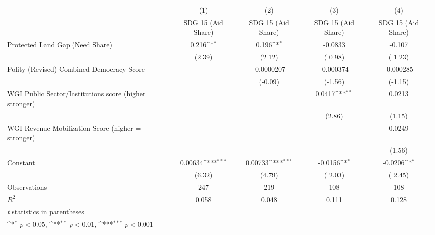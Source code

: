 {
\def\sym#1{\ifmmode^{#1}\else\(^{#1}\)\fi}
\begin{tabular}{l*{4}{c}}
\hline\hline
                &\multicolumn{1}{c}{(1)}&\multicolumn{1}{c}{(2)}&\multicolumn{1}{c}{(3)}&\multicolumn{1}{c}{(4)}\\
                &\multicolumn{1}{c}{SDG 15 (Aid Share)}&\multicolumn{1}{c}{SDG 15 (Aid Share)}&\multicolumn{1}{c}{SDG 15 (Aid Share)}&\multicolumn{1}{c}{SDG 15 (Aid Share)}\\
\hline
Protected Land Gap (Need Share)&    0.216\sym{*}  &    0.196\sym{*}  &  -0.0833         &   -0.107         \\
                &   (2.39)         &   (2.12)         &  (-0.98)         &  (-1.23)         \\
[1em]
Polity (Revised) Combined Democracy Score&                  &-0.0000207         &-0.000374         &-0.000285         \\
                &                  &  (-0.09)         &  (-1.56)         &  (-1.15)         \\
[1em]
WGI Public Sector/Institutions score (higher = stronger)&                  &                  &   0.0417\sym{**} &   0.0213         \\
                &                  &                  &   (2.86)         &   (1.15)         \\
[1em]
WGI Revenue Mobilization Score (higher = stronger)&                  &                  &                  &   0.0249         \\
                &                  &                  &                  &   (1.56)         \\
[1em]
Constant        &  0.00634\sym{***}&  0.00733\sym{***}&  -0.0156\sym{*}  &  -0.0206\sym{*}  \\
                &   (6.32)         &   (4.79)         &  (-2.03)         &  (-2.45)         \\
\hline
Observations    &      247         &      219         &      108         &      108         \\
\(R^{2}\)       &    0.058         &    0.048         &    0.111         &    0.128         \\
\hline\hline
\multicolumn{5}{l}{\footnotesize \textit{t} statistics in parentheses}\\
\multicolumn{5}{l}{\footnotesize \sym{*} \(p<0.05\), \sym{**} \(p<0.01\), \sym{***} \(p<0.001\)}\\
\end{tabular}
}
